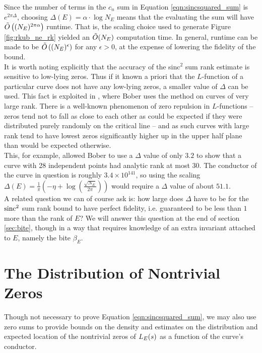 Since the number of terms in the $c_n$ sum in Equation \ref{eqn:sincsquared_sum} is $e^{2\pi\Delta}$, choosing $\Delta(E) = \alpha \cdot \log N_E$ means that the evaluating the sum will have $\tilde{O}\left((N_E)^{2\pi \alpha} \right)$ runtime. That is, the scaling choice used to generate Figure \ref{fig:rkub_ne_rk} yielded an $\tilde{O}(N_E)$ computation time. In general, runtime can be made to be $\tilde{O}\left((N_E)^{\epsilon}\right)$ for any $\epsilon>0$, at the expense of lowering the fidelity of the bound. \\

It is worth noting explicitly that the accuracy of the sinc$^2$ sum rank estimate is sensitive to low-lying zeros. Thus if it known a priori that the $L$-function of a particular curve does not have any low-lying zeros, a smaller value of $\Delta$ can be used. This fact is exploited in \cite{Bob-2011}, where Bober uses the method on curves of very large rank. There is a well-known phenomenon of zero repulsion in $L$-functions -- zeros tend not to fall as close to each other as could be expected if they were distributed purely randomly on the critical line -- and as such curves with large rank tend to have lowest zeros significantly higher up in the upper half plane than would be expected otherwise. \\

This, for example, allowed Bober to use a $\Delta$ value of only $3.2$ to show that a curve with 28 independent points had analytic rank at most 30. The conductor of the curve in question is roughly $3.4\times 10^{141}$, so using the scaling $\Delta(E) = \frac{1}{\pi}\left(-\eta + \log\left(\frac{\sqrt{N_E}}{2\pi}\right)\right)$ would require a $\Delta$ value of about $51.1$. \\

A related question we can of course ask is: how large does $\Delta$ have to be for the $\operatorname{sinc}^2$ sum rank bound to have perfect fidelity, i.e. guaranteed to be less than $1$ more than the rank of $E$? We will answer this question at the end of section \ref{sec:bite}, though in a way that requires knowledge of an extra invariant attached to $E$, namely the bite $\beta_E$.

\newpage
\section{The Distribution of Nontrivial Zeros}

Though not necessary to prove Equation \ref{eqn:sincsquared_sum}, we may also use zero sums to provide bounds on the density and estimates on the distribution and expected location of the nontrivial zeros of $L_E(s)$ as a function of the curve's conductor.

